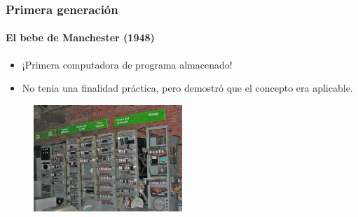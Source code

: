 \documentclass[11pt,a4paper,spanish]{beamer}
\begin{document}
\begin{frame}

\frametitle{Primera generación}
\framesubtitle{El bebe de Manchester (1948)}

\begin{itemize}
    \item ¡Primera computadora de programa almacenado!
    \item No tenia una finalidad práctica, pero demostró que el concepto era
        aplicable.
\end{itemize}

\begin{figure}
    \includegraphics[width=0.5\textwidth]{img/mbaby.jpg}
    \captionsetup{textfont=tiny,labelformat=empty}
    \caption{}
\end{figure}

\end{frame}
\end{document}
